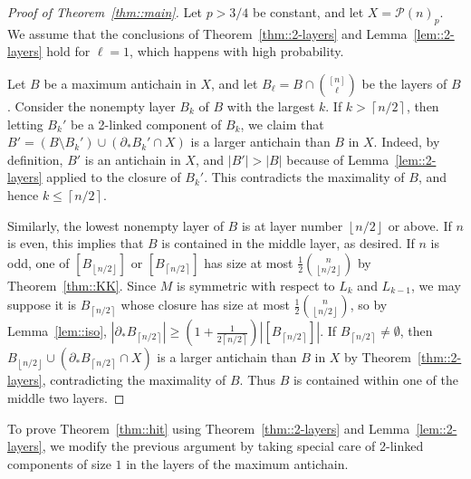\documentclass[12pt]{article}
\renewcommand{\P}{\mathcal{P}}
\newcommand{\floor}[1]{\left\lfloor#1\right\rfloor}
\newcommand{\ceil}[1]{\left\lceil#1\right\rceil}
\begin{document}
\begin{proof}[Proof of Theorem~\ref{thm::main}]
Let $p>3/4$ be constant, and let $X = \P(n)_p$. We assume that the conclusions of Theorem~\ref{thm::2-layers} and Lemma~\ref{lem::2-layers} hold for $\ell = 1$, which happens with high probability.

Let $B$ be a maximum antichain in $X$, and let $B_\ell = B \cap \binom{[n]}{\ell}$ be the layers of $B$. Consider the nonempty layer $B_k$ of $B$ with the largest $k$. If $k > \ceil{n/2}$, then letting $B_k'$ be a 2-linked component of $B_k$, we claim that $B' = (B \setminus B_k') \cup (\partial_* B_k' \cap X)$ is a larger antichain than $B$ in $X$. Indeed, by definition, $B'$ is an antichain in $X$, and $|B'| > |B|$ because of Lemma~\ref{lem::2-layers} applied to the closure of $B_k'$. This contradicts the maximality of $B$, and hence $k \leq \ceil{n/2}$.

Similarly, the lowest nonempty layer of $B$ is at layer number $\floor{n/2}$ or above. If $n$ is even, this implies that $B$ is contained in the middle layer, as desired. If $n$ is odd, one of $[B_{\floor{n/2}}]$ or $[B_{\ceil{n/2}}]$ has size at most $\frac{1}{2} \binom{n}{\floor{n/2}}$ by Theorem~\ref{thm::KK}. Since $M$ is symmetric with respect to $L_k$ and $L_{k-1}$, we may suppose it is $B_{\ceil{n/2}}$ whose closure has size at most $\frac{1}{2} \binom{n}{\floor{n/2}}$, so by Lemma~\ref{lem::iso}, $|\partial_* B_{\ceil{n/2}}| \geq (1+\frac{1}{2\ceil{n/2}})|[B_{\ceil{n/2}}]|$. If $B_{\ceil{n/2}} \neq \emptyset$, then $B_{\floor{n/2}} \cup (\partial_* B_{\ceil{n/2}} \cap X)$ is a larger antichain than $B$ in $X$ by Theorem~\ref{thm::2-layers}, contradicting the maximality of $B$. Thus $B$ is contained within one of the middle two layers.
\end{proof}

To prove Theorem~\ref{thm::hit} using Theorem~\ref{thm::2-layers} and Lemma~\ref{lem::2-layers}, we modify the previous argument by taking special care of 2-linked components of size $1$ in the layers of the maximum antichain.
\end{document}
